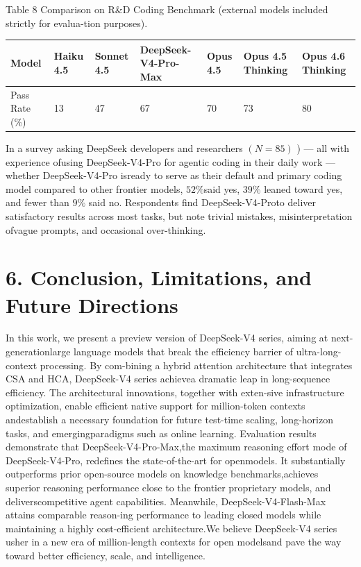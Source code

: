 \documentclass[
  10
]{article}
\newcounter{none} %
\begin{document}
Table 8 \textbar{} Comparison on R\&D Coding Benchmark (external models
included strictly for evalua-tion purposes).

{\def\LTcaptype{none} %
\begin{longtable}[]{@{}|l|l|l|l|l|l|l|@{}}
\toprule\noalign{}
\endhead
\bottomrule\noalign{}
\endlastfoot
\hline
Model & Haiku 4.5 & Sonnet 4.5 & DeepSeek-V4-Pro-Max & Opus 4.5 & Opus
4.5 Thinking & Opus 4.6 Thinking \\
\hline
Pass Rate (\%) & 13 & 47 & 67 & 70 & 73 & 80 \\
\hline
\end{longtable}
}

In a survey asking DeepSeek developers and researchers \(( N = 8 5 )\) )
--- all with experience ofusing DeepSeek-V4-Pro for agentic coding in
their daily work --- whether DeepSeek-V4-Pro isready to serve as their
default and primary coding model compared to other frontier models,
\(5 2 \%\)said yes, \(3 9 \%\) leaned toward yes, and fewer than
\(9 \%\) said no. Respondents find DeepSeek-V4-Proto deliver
satisfactory results across most tasks, but note trivial mistakes,
misinterpretation ofvague prompts, and occasional over-thinking.

\section{6. Conclusion, Limitations, and Future
Directions}\label{conclusion-limitations-and-future-directions}

In this work, we present a preview version of DeepSeek-V4 series, aiming
at next-generationlarge language models that break the efficiency
barrier of ultra-long-context processing. By com-bining a hybrid
attention architecture that integrates CSA and HCA, DeepSeek-V4 series
achievea dramatic leap in long-sequence efficiency. The architectural
innovations, together with exten-sive infrastructure optimization,
enable efficient native support for million-token contexts andestablish
a necessary foundation for future test-time scaling, long-horizon tasks,
and emergingparadigms such as online learning. Evaluation results
demonstrate that DeepSeek-V4-Pro-Max,the maximum reasoning effort mode
of DeepSeek-V4-Pro, redefines the state-of-the-art for openmodels. It
substantially outperforms prior open-source models on knowledge
benchmarks,achieves superior reasoning performance close to the frontier
proprietary models, and deliverscompetitive agent capabilities.
Meanwhile, DeepSeek-V4-Flash-Max attains comparable reason-ing
performance to leading closed models while maintaining a highly
cost-efficient architecture.We believe DeepSeek-V4 series usher in a new
era of million-length contexts for open modelsand pave the way toward
better efficiency, scale, and intelligence.
\end{document}
